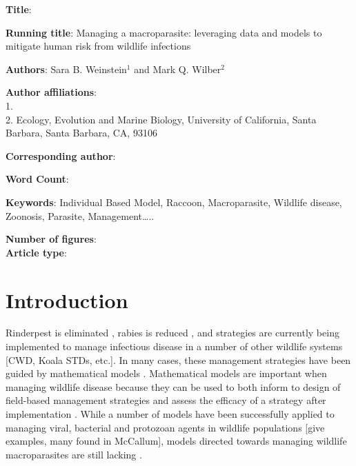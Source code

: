 \documentclass[11pt]{article}
\begin{document}
\noindent
\textbf{Title}{}: 

\bigskip

\noindent
\textbf{Running title}: Managing a macroparasite: leveraging data and models to mitigate human risk from wildlife infections

\bigskip

\noindent
\textbf{Authors}: Sara B. Wein{}stein$^1$ and Mark Q. Wilber$^2$

\bigskip

\noindent
\textbf{Author affiliations}: \\
1. \\
2. Ecology, Evolution and Marine Biology, University of California, Santa Barbara, Santa Barbara, CA, 93106 \\

\bigskip

\noindent
\textbf{Corresponding author}:

\bigskip

\noindent
\textbf{Word Count}: 

\bigskip

\noindent
\textbf{Keywords}: Individual Based Model, Raccoon, Macroparasite,
Wildlife disease, Zoonosis, Parasite, Management\ldots{}..

\bigskip

\noindent
\textbf{Number of figures}:  \\
\textbf{Article type}: 

\clearpage

\section{Introduction}

Rinderpest is eliminated \citep{Roeder2011}, rabies is reduced \citep{Freuling2013}, and strategies are currently being implemented to manage infectious disease in a number of other wildlife systems [CWD, Koala STDs, etc.]. In many cases, these management strategies have been
guided by mathematical models \citep[e.g.][]{Restif2012,McCallum2017}.  Mathematical models are important when managing wildlife disease because they can be used to both inform to design of field-based management strategies and assess the efficacy of a strategy after implementation  \citep{Restif2012}.  While a number of models have been successfully applied to managing
viral, bacterial and protozoan agents in wildlife populations [give examples, many found in McCallum], models directed
towards managing wildlife macroparasites are still lacking \citep[][, but see X X X for macroparasite models in livestock]{McCallum2017}.
\end{document}
